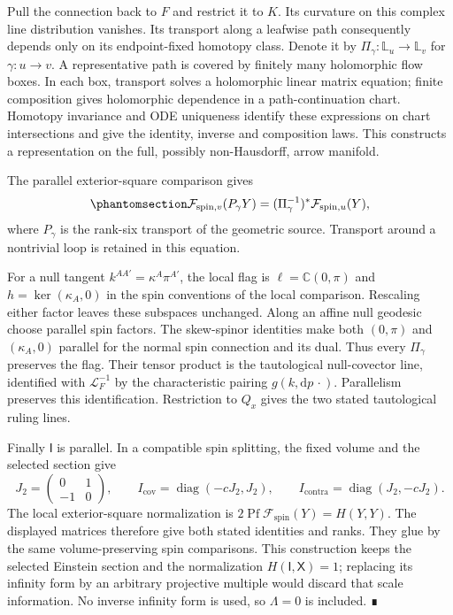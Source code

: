 \documentclass[
  english,
  11pt,
  reqno]{amsart}
\begin{document}
Pull the connection back to \(F\) and restrict it to \(K\). Its
curvature on this complex line distribution vanishes. Its transport
along a leafwise path consequently depends only on its endpoint-fixed
homotopy class. Denote it by \(\Pi_\gamma:\mathbb L_u\to\mathbb L_v\)
for \(\gamma:u\to v\). A representative path is covered by finitely many
holomorphic flow boxes. In each box, transport solves a holomorphic
linear matrix equation; finite composition gives holomorphic dependence
in a path-continuation chart. Homotopy invariance and ODE uniqueness
identify these expressions on chart intersections and give the identity,
inverse and composition laws. This constructs a representation on the
full, possibly non-Hausdorff, arrow manifold.

The parallel exterior-square comparison gives
\begin{equation}\protect\phantomsection\label{eq:global-spin-tractor-transport}{
\mathcal F_{\mathrm{spin},v}(P_\gamma Y)
=(\Pi_\gamma^{-1})^*
\mathcal F_{\mathrm{spin},u}(Y),
}\end{equation} where \(P_\gamma\) is the rank-six transport of the
geometric source. Transport around a nontrivial loop is retained in this
equation.

For a null tangent \(k^{AA'}=\kappa^A\pi^{A'}\), the local flag is
\(\ell=\mathbb C(0,\pi)\) and \(h=\ker(\kappa_A,0)\) in the spin
conventions of the local comparison. Rescaling either factor leaves
these subspaces unchanged. Along an affine null geodesic choose parallel
spin factors. The skew-spinor identities make both \((0,\pi)\) and
\((\kappa_A,0)\) parallel for the normal spin connection and its dual.
Thus every \(\Pi_\gamma\) preserves the flag. Their tensor product is
the tautological null-covector line, identified with
\(\mathcal L_F^{-1}\) by the characteristic pairing
\(g(k,\mathrm dp\,\cdot)\). Parallelism preserves this identification.
Restriction to \(Q_x\) gives the two stated tautological ruling lines.

Finally \(\mathsf I\) is parallel. In a compatible spin splitting, the
fixed volume and the selected section give \[
J_2=\begin{pmatrix}0&1\\-1&0\end{pmatrix},
\qquad
I_{\mathrm{cov}}=\operatorname{diag}(-cJ_2,J_2),
\qquad
I_{\mathrm{contra}}=\operatorname{diag}(J_2,-cJ_2).
\] The local exterior-square normalization is
\(2\operatorname{Pf}\mathcal F_{\mathrm{spin}}(Y)=H(Y,Y)\). The
displayed matrices therefore give both stated identities and ranks. They
glue by the same volume-preserving spin comparisons. This construction
keeps the selected Einstein section and the normalization
\(H(\mathsf I,\mathsf X)=1\); replacing its infinity form by an
arbitrary projective multiple would discard that scale information. No
inverse infinity form is used, so \(\Lambda=0\) is included. ∎
\end{document}
